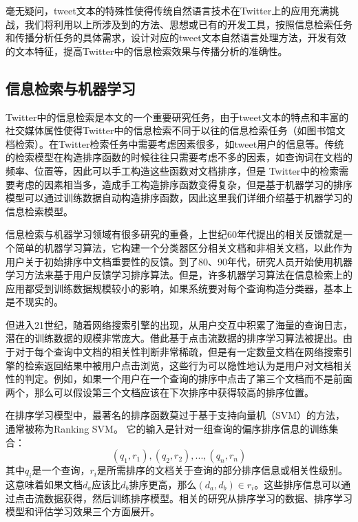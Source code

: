 毫无疑问，tweet文本的特殊性使得传统自然语言技术在Twitter上的应用充满挑战，我们将利用以上所涉及到的方法、思想或已有的开发工具，按照信息检索任务和传播分析任务的具体需求，设计对应的tweet文本自然语言处理方法，开发有效的文本特征，提高Twitter中的信息检索效果与传播分析的准确性。

\subsection{信息检索与机器学习}
\label{rel2}
Twitter中的信息检索是本文的一个重要研究任务，由于tweet文本的特点和丰富的社交媒体属性使得Twitter中的信息检索不同于以往的信息检索任务（如图书馆文档检索）。在Twitter检索任务中需要考虑因素很多，如tweet用户的信息等。传统的检索模型在构造排序函数的时候往往只需要考虑不多的因素，如查询词在文档的频率、位置等，因此可以手工构造这些函数对文档排序，但是 Twitter中的检索需要考虑的因素相当多，造成手工构造排序函数变得复杂，但是基于机器学习的排序模型可以通过训练数据自动构造排序函数，因此这里我们详细介绍基于机器学习的信息检索模型。

信息检索与机器学习领域有很多研究的重叠，上世纪60年代提出的相关反馈就是一个简单的机器学习算法，它构建一个分类器区分相关文档和非相关文档，以此作为用户关于初始排序中文档重要性的反馈。到了80、90年代，研究人员开始使用机器学习方法来基于用户反馈学习排序算法。但是，许多机器学习算法在信息检索上的应用都受到训练数据规模较小的影响，如果系统要对每个查询构造分类器，基本上是不现实的。

但进入21世纪，随着网络搜索引擎的出现，从用户交互中积累了海量的查询日志，潜在的训练数据的规模非常庞大。借此基于点击流数据的排序学习算法被提出。由于对于每个查询中文档的相关性判断非常稀疏，但是有一定数量文档在网络搜索引擎的检索返回结果中被用户点击浏览，这些行为可以隐性地认为是用户对文档相关性的判定。例如，如果一个用户在一个查询的排序中点击了第三个文档而不是前面两个，那么可以假设第三个文档应该在下次排序中获得较高的排序位置。

在排序学习模型中，最著名的排序函数莫过于基于支持向量机（SVM）的方法，通常被称为Ranking SVM。 它的输入是针对一组查询的偏序排序信息的训练集合：
$$(q_1,r_1),(q_2,r_2),...,(q_n,r_n)$$
其中$q_i$是一个查询，$r_i$是所需排序的文档关于查询的部分排序信息或相关性级别。这意味着如果文档$d_a$应该比$d_b$排序更高，那么$(d_a,d_b)\in r_i$。这些排序信息可以通过点击流数据获得，然后训练排序模型。相关的研究从排序学习的数据、排序学习模型和评估学习效果三个方面展开。

